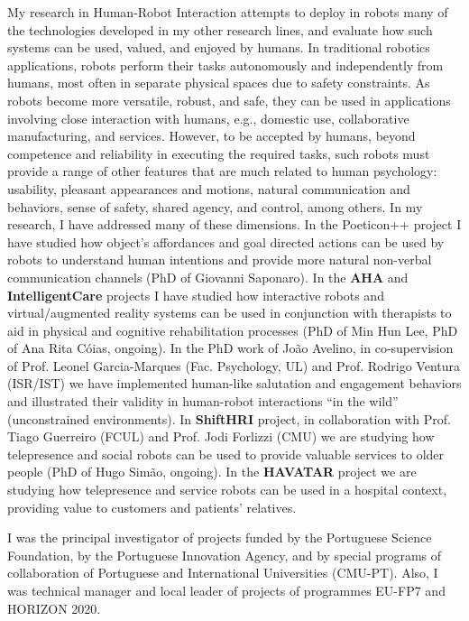 My research in Human-Robot Interaction attempts to deploy in robots many
of the technologies developed in my other research lines, and evaluate
how such systems can be used, valued, and enjoyed by humans. In
traditional robotics applications, robots perform their tasks
autonomously and independently from humans, most often in separate
physical spaces due to safety constraints. As robots become more
versatile, robust, and safe, they can be used in applications involving
close interaction with humans, e.g., domestic use, collaborative
manufacturing, and services. However, to be accepted by humans, beyond
competence and reliability in executing the required tasks, such robots
must provide a range of other features that are much related to human
psychology: usability, pleasant appearances and motions, natural
communication and behaviors, sense of safety, shared agency, and
control, among others. In my research, I have addressed many of these
dimensions. In the Poeticon++ project I have studied how object's
affordances and goal directed actions can be used by robots to
understand human intentions and provide more natural non-verbal
communication channels (PhD of Giovanni Saponaro). In the \textbf{AHA}
and \textbf{IntelligentCare} projects I have studied how interactive
robots and virtual/augmented reality systems can be used in conjunction
with therapists to aid in physical and cognitive rehabilitation
processes (PhD of Min Hun Lee, PhD of Ana Rita Cóias, ongoing). In the
PhD work of João Avelino, in co-supervision of Prof. Leonel
Garcia-Marques (Fac. Psychology, UL) and Prof. Rodrigo Ventura (ISR/IST)
we have implemented human-like salutation and engagement behaviors and
illustrated their validity in human-robot interactions ``in the wild''
(unconstrained environments). In \textbf{ShiftHRI} project, in
collaboration with Prof. Tiago Guerreiro (FCUL) and Prof. Jodi Forlizzi
(CMU) we are studying how telepresence and social robots can be used to
provide valuable services to older people (PhD of Hugo Simão, ongoing).
In the \textbf{HAVATAR} project we are studying how telepresence and
service robots can be used in a hospital context, providing value to
customers and patients' relatives.

I was the principal investigator of projects funded by the Portuguese
Science Foundation, by the Portuguese Innovation Agency, and by special
programs of collaboration of Portuguese and International Universities
(CMU-PT). Also, I was technical manager and local leader of projects of
programmes EU-FP7 and HORIZON 2020.

